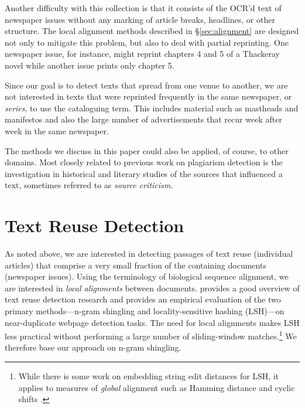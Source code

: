 \documentclass[pdftex,11pt]{article}
\begin{document}
Another difficulty with this collection is that it consists of the
OCR'd text of newspaper issues without any marking of article breaks,
headlines, or other structure.  The local alignment methods described
in \S\ref{sec:alignment} are designed not only to mitigate this
problem, but also to deal with partial reprinting.  One newspaper
issue, for instance, might reprint chapters 4 and 5 of a Thackeray
novel while another issue prints only chapter 5.

Since our goal is to detect texts that spread from one venue to
another, we are not interested in texts that were reprinted frequently
in the same newspaper, or \textit{series}, to use the cataloguing
term.  This includes material such as mastheads and manifestos and
also the large number of advertisements that recur week after week in
the same newspaper.

The methods we discuss in this paper could also be applied, of course,
to other domains.  Most closely related to previous work on plagiarism
detection is the investigation in historical and literary studies of
the sources that influenced a text, sometimes referred to as
\emph{source criticism}.

\section{Text Reuse Detection}
\label{sec:detection}

As noted above, we are interested in detecting passages of text reuse
(individual articles) that comprise a very small fraction of the
containing documents (newspaper issues).  Using the terminology of
biological sequence alignment, we are interested in \emph{local
  alignments} between documents.
\citet{henzinger06:_findin_near_duplic_web_pages} provides a good
overview of text reuse detection research and provides an empirical
evaluation of the two primary methods---n-gram shingling and
locality-sensitive hashing (LSH)---on near-duplicate webpage detection
tasks.  The need for local alignments makes LSH less practical without
performing a large number of sliding-window matches.\footnote{While
  there is some work on embedding string edit distances for LSH, it
  applies to measures of \emph{global} alignment such as Hamming
  distance and cyclic shifts \citep{andoni13:_homom_finger_misal}.} We
therefore base our approach on n-gram shingling.
\end{document}
